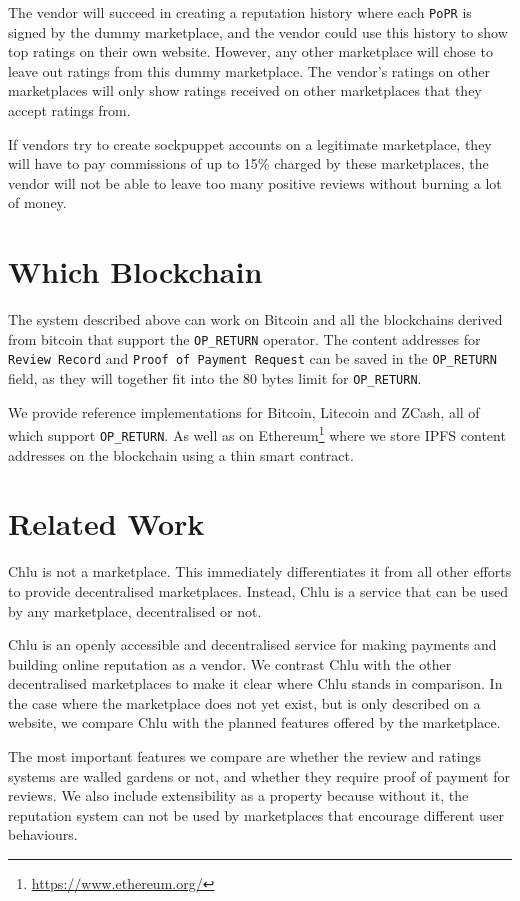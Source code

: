 \documentclass[a4paper]{article}
\begin{document}
The vendor will succeed in creating a reputation history where each
\texttt{PoPR} is signed by the dummy marketplace, and the vendor could
use this history to show top ratings on their own website. However, any
other marketplace will chose to leave out ratings from this dummy
marketplace. The vendor's ratings on other marketplaces will only show
ratings received on other marketplaces that they accept ratings from.

If vendors try to create sockpuppet accounts on a legitimate
marketplace, they will have to pay commissions of up to 15\% charged
by these marketplaces, the vendor will not be able to leave too many
positive reviews without burning a lot of money.

\section{Which Blockchain}

The system described above can work on Bitcoin and all the blockchains
derived from bitcoin that support the \texttt{OP\_RETURN}
operator. The content addresses for \texttt{Review Record} and
\texttt{Proof of Payment Request} can be saved in the
\texttt{OP\_RETURN} field, as they will together fit into the 80 bytes
limit for \texttt{OP\_RETURN}.

We provide reference implementations for Bitcoin, Litecoin and ZCash,
all of which support \texttt{OP\_RETURN}. As well as on
Ethereum\footnote{\url{https://www.ethereum.org/}} where we store IPFS
content addresses on the blockchain using a thin smart contract.

\section{Related Work}

Chlu is not a marketplace. This immediately differentiates it from all
other efforts to provide decentralised marketplaces. Instead, Chlu is
a service that can be used by any marketplace, decentralised or not.

Chlu is an openly accessible and decentralised service for making
payments and building online reputation as a vendor. We contrast Chlu
with the other decentralised marketplaces to make it clear where Chlu
stands in comparison. In the case where the marketplace does not yet
exist, but is only described on a website, we compare Chlu with the
planned features offered by the marketplace.

The most important features we compare are whether the review and
ratings systems are walled gardens or not, and whether they require
proof of payment for reviews. We also include extensibility as a
property because without it, the reputation system can not be used by
marketplaces that encourage different user behaviours.
\end{document}
